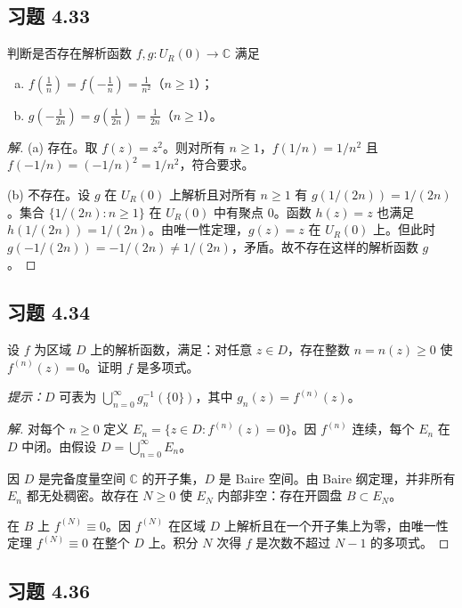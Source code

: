 \documentclass[11pt,a4paper]{article}
\newcommand{\C}{\mathbb{C}}
\theoremstyle{definition}
\newenvironment{solution}{\begin{proof}[解]}{\end{proof}}
\begin{document}
\subsection{习题 4.33}

判断是否存在解析函数 $f, g : U_R(0) \to \C$ 满足
\begin{enumerate}[(a)]
  \item $f(\tfrac{1}{n}) = f(-\tfrac{1}{n}) = \tfrac{1}{n^2}$（$n \ge 1$）；
  \item $g(-\tfrac{1}{2n}) = g(\tfrac{1}{2n}) = \tfrac{1}{2n}$（$n \ge 1$）。
\end{enumerate}

\begin{solution}
  (a) 存在。取 $f(z) = z^2$。则对所有 $n \ge 1$，$f(1/n) = 1/n^2$ 且 $f(-1/n) = (-1/n)^2 = 1/n^2$，符合要求。

  \medskip
  (b) 不存在。设 $g$ 在 $U_R(0)$ 上解析且对所有 $n \ge 1$ 有 $g(1/(2n)) = 1/(2n)$。集合 $\{1/(2n) : n \ge 1\}$ 在 $U_R(0)$ 中有聚点 $0$。函数 $h(z) = z$ 也满足 $h(1/(2n)) = 1/(2n)$。由唯一性定理，$g(z) = z$ 在 $U_R(0)$ 上。但此时 $g(-1/(2n)) = -1/(2n) \ne 1/(2n)$，矛盾。故不存在这样的解析函数 $g$。
\end{solution}

\subsection{习题 4.34}

设 $f$ 为区域 $D$ 上的解析函数，满足：对任意 $z \in D$，存在整数 $n = n(z) \ge 0$ 使 $f^{(n)}(z) = 0$。证明 $f$ 是多项式。

\textit{提示：}$D$ 可表为 $\bigcup_{n=0}^{\infty} g_n^{-1}(\{0\})$，其中 $g_n(z) = f^{(n)}(z)$。

\begin{solution}
  对每个 $n \ge 0$ 定义 $E_n = \{z \in D : f^{(n)}(z) = 0\}$。因 $f^{(n)}$ 连续，每个 $E_n$ 在 $D$ 中闭。由假设 $D = \bigcup_{n=0}^{\infty} E_n$。

  因 $D$ 是完备度量空间 $\C$ 的开子集，$D$ 是 Baire 空间。由 Baire 纲定理，并非所有 $E_n$ 都无处稠密。故存在 $N \ge 0$ 使 $E_N$ 内部非空：存在开圆盘 $B \subset E_N$。

  在 $B$ 上 $f^{(N)} \equiv 0$。因 $f^{(N)}$ 在区域 $D$ 上解析且在一个开子集上为零，由唯一性定理 $f^{(N)} \equiv 0$ 在整个 $D$ 上。积分 $N$ 次得 $f$ 是次数不超过 $N - 1$ 的多项式。
\end{solution}

\subsection{习题 4.36}
\end{document}
